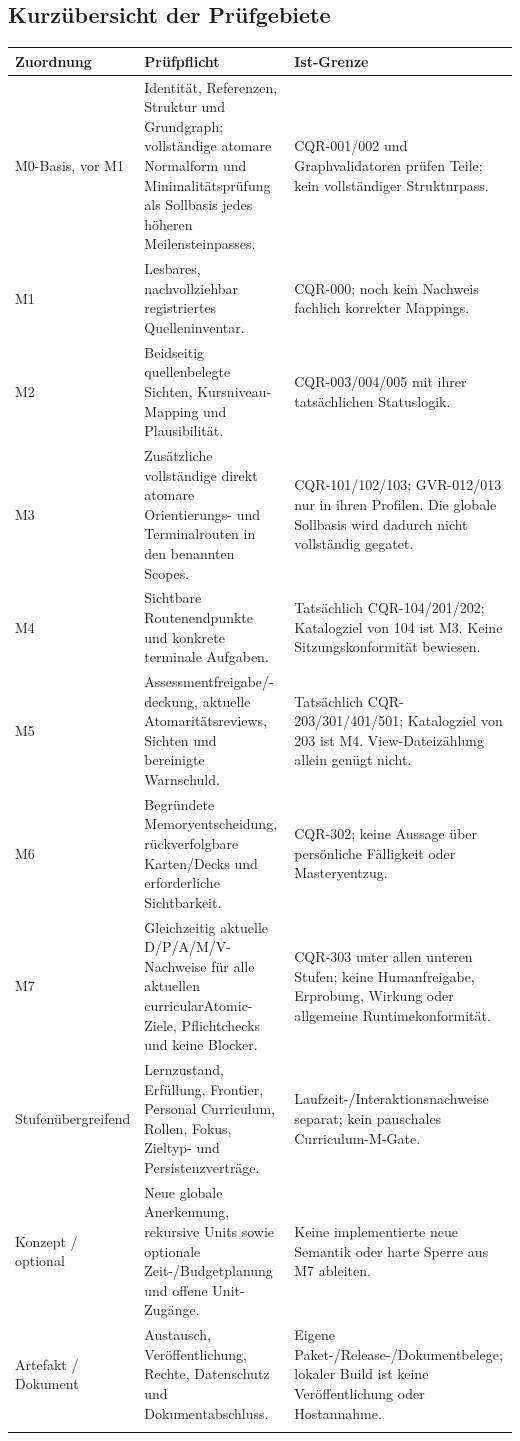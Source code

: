 \subsection{Kurzübersicht der Prüfgebiete}
\begingroup\small
\begin{longtable}{@{}P{23mm}P{64mm}P{61mm}@{}}
\toprule
Zuordnung & Prüfpflicht & Ist-Grenze\\
\midrule\endhead
M0-Basis, vor M1 & Identität, Referenzen, Struktur und Grundgraph; vollständige atomare Normalform und Minimalitätsprüfung als Sollbasis jedes höheren Meilensteinpasses. & CQR-001/002 und Graphvalidatoren prüfen Teile; kein vollständiger Strukturpass.\\\addlinespace[4pt]
M1 & Lesbares, nachvollziehbar registriertes Quelleninventar. & CQR-000; noch kein Nachweis fachlich korrekter Mappings.\\\addlinespace[4pt]
M2 & Beidseitig quellenbelegte Sichten, Kursniveau-Mapping und Plausibilität. & CQR-003/004/005 mit ihrer tatsächlichen Statuslogik.\\\addlinespace[4pt]
M3 & Zusätzliche vollständige direkt atomare Orientierungs- und Terminalrouten in den benannten Scopes. & CQR-101/102/103; GVR-012/013 nur in ihren Profilen. Die globale Sollbasis wird dadurch nicht vollständig gegatet.\\\addlinespace[4pt]
M4 & Sichtbare Routenendpunkte und konkrete terminale Aufgaben. & Tatsächlich CQR-104/201/202; Katalogziel von 104 ist M3. Keine Sitzungskonformität bewiesen.\\\addlinespace[4pt]
M5 & Assessmentfreigabe/-deckung, aktuelle Atomaritätsreviews, Sichten und bereinigte Warnschuld. & Tatsächlich CQR-203/301/401/501; Katalogziel von 203 ist M4. View-Dateizählung allein genügt nicht.\\\addlinespace[4pt]
M6 & Begründete Memoryentscheidung, rückverfolgbare Karten/Decks und erforderliche Sichtbarkeit. & CQR-302; keine Aussage über persönliche Fälligkeit oder Masteryentzug.\\\addlinespace[4pt]
M7 & Gleichzeitig aktuelle D/P/A/M/V-Nachweise für alle aktuellen curricularAtomic-Ziele, Pflichtchecks und keine Blocker. & CQR-303 unter allen unteren Stufen; keine Humanfreigabe, Erprobung, Wirkung oder allgemeine Runtimekonformität.\\\addlinespace[4pt]
Stufenübergreifend & Lernzustand, Erfüllung, Frontier, Personal Curriculum, Rollen, Fokus, Zieltyp- und Persistenzverträge. & Laufzeit-/Interaktionsnachweise separat; kein pauschales Curriculum-M-Gate.\\\addlinespace[4pt]
Konzept / optional & Neue globale Anerkennung, rekursive Units sowie optionale Zeit-/Budgetplanung und offene Unit-Zugänge. & Keine implementierte neue Semantik oder harte Sperre aus M7 ableiten.\\\addlinespace[4pt]
Artefakt / Dokument & Austausch, Veröffentlichung, Rechte, Datenschutz und Dokumentabschluss. & Eigene Paket-/Release-/Dokumentbelege; lokaler Build ist keine Veröffentlichung oder Hostannahme.\\\addlinespace[4pt]
\bottomrule
\end{longtable}
\endgroup

